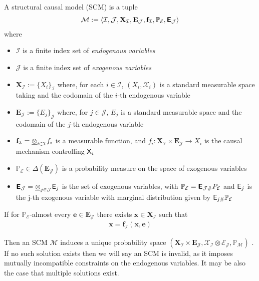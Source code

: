 \begin{definition}\label{def:SCM}
	A structural causal model (SCM) is a tuple 
	\begin{align}
		\mathcal{M}:=\langle \mathcal{I},\mathcal{J},\mathbf{X}_{\mathcal{I}},\mathbf{E}_{\mathcal{J}},\mathbf{f}_{\mathcal{I}},\mathbb{P}_{\mathcal{E}},\bm{\mathsf{E}}_{\mathcal{J}}\rangle
	\end{align}
	where 
	\begin{itemize}
		\item $\mathcal{I}$ is a finite index set of \emph{endogenous variables}
		\item $\mathcal{J}$ is a finite index set of \emph{exogenous variables}
		\item $\mathbf{X}_{\mathcal{I}}:=\{X_i\}_{\mathcal{I}}$ where, for each $i\in \mathcal{I}$, $(X_i,\mathcal{X}_i)$ is a standard measurable space taking and the codomain of the $i$-th endogenous variable
		\item $\mathbf{E}_{\mathcal{J}}:=\{E_j\}_{\mathcal{J}}$ where, for $j\in \mathcal{J}$, $E_j$ is a standard measurable space and the codomain of the $j$-th endogenous variable
		\item $\mathbf{f}_{\mathcal{I}}=\underline{\otimes}_{i\in\mathcal{I}} f_i$ is a measurable function, and $f_i:\mathbf{X}_{\mathcal{I}}\times\mathbf{E}_{\mathcal{J}}\to X_i$ is the causal mechanism controlling $\mathsf{X}_i$
		\item $\mathbb{P}_{\mathcal{E}}\in \Delta(\mathbf{E}_{\mathcal{J}})$ is a probability measure on the space of exogenous variables
		\item $\bm{\mathsf{E}}_{\mathcal{J}}=\underline{\otimes}_{j\in\mathcal{J}} \mathsf{E}_j$ is the set of exogenous variables, with $\mathbb{P}_{\mathcal{E}}=\bm{\mathsf{E}}_{\mathcal{J}\#}P_{\mathcal{E}}$ and $\mathsf{E}_j$ is the j-th exogenous variable with marginal distribution given by $\mathsf{E}_{j\#}\mathbb{P}_{\mathcal{E}}$
	\end{itemize}
\end{definition}

If for $\mathbb{P}_{\mathcal{E}}$-almost every $\mathbf{e}\in\mathbf{E}_{\mathcal{J}}$ there exists $\mathbf{x}\in\mathbf{X}_{\mathcal{I}}$ such that
\begin{align}
	\mathbf{x} = \mathbf{f}_{\mathcal{I}}(\mathbf{x},\mathbf{e})
\end{align}

Then an SCM $\mathcal{M}$ induces a unique probability space $(\mathbf{X}_{\mathcal{I}}\times\mathbf{E}_{\mathcal{J}},\mathcal{X}_{\mathcal{I}}\otimes\mathcal{E}_{\mathcal{J}},\mathbb{P}_{\mathcal{M}})$ \citep{bongers_theoretical_2016}. If no such solution exists then we will say an SCM is invalid, as it imposes mutually incompatible constraints on the endogenous variables. It may be also the case that multiple solutions exist.

